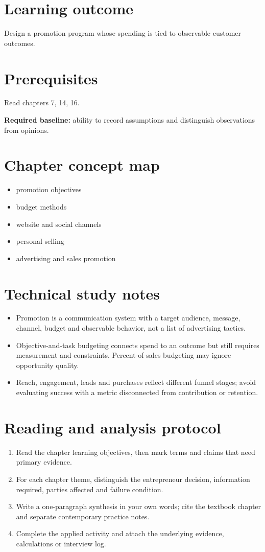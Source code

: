 \documentclass[11pt,letterpaper]{article}
\begin{document}
\SuiteOpen
\section{Learning outcome}
Design a promotion program whose spending is tied to observable customer outcomes.
\section{Prerequisites}
Read chapters 7, 14, 16.\par\textbf{Required baseline:} ability to record assumptions and distinguish observations from opinions.
\section{Chapter concept map}
\begin{itemize}[leftmargin=*,itemsep=3pt]
\item promotion objectives
\item budget methods
\item website and social channels
\item personal selling
\item advertising and sales promotion
\end{itemize}

\section{Technical study notes}
\begin{itemize}[leftmargin=*,itemsep=3pt]
\item Promotion is a communication system with a target audience, message, channel, budget and observable behavior, not a list of advertising tactics.
\item Objective-and-task budgeting connects spend to an outcome but still requires measurement and constraints. Percent-of-sales budgeting may ignore opportunity quality.
\item Reach, engagement, leads and purchases reflect different funnel stages; avoid evaluating success with a metric disconnected from contribution or retention.
\end{itemize}

\section{Reading and analysis protocol}
\begin{enumerate}[leftmargin=*,itemsep=5pt]
\item Read the chapter learning objectives, then mark terms and claims that need primary evidence.
\item For each chapter theme, distinguish the entrepreneur decision, information required, parties affected and failure condition.
\item Write a one-paragraph synthesis in your own words; cite the textbook chapter and separate contemporary practice notes.
\item Complete the applied activity and attach the underlying evidence, calculations or interview log.
\end{enumerate}
\end{document}
